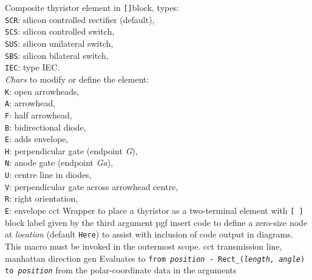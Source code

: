   {Composite thyristor element in {\tt []}block, types:\\
                     {\tt SCR}: silicon controlled rectifier (default),\\
                     {\tt SCS}: silicon controlled switch,\\
                     {\tt SUS}: silicon unilateral switch,\\
                     {\tt SBS}: silicon bilateral switch,\\
                     {\tt IEC}: type IEC.\\
   {\sl Chars} to modify or define the element:\\
                     {\tt K}: open arrowheads,\\
                     {\tt A}: arrowhead,\\
                     {\tt F}: half arrowhead,\\
                     {\tt B}: bidirectional diode,\\
                     {\tt E}: adds envelope,\\
                     {\tt H}: perpendicular gate (endpoint {\sl G}),\\
                     {\tt N}: anode gate (endpoint {\sl Ga}),\\
                     {\tt U}: centre line in diodes,\\
                     {\tt V}: perpendicular gate across arrowhead centre,\\
                     {\tt R}: right orientation,\\
                     {\tt E}: envelope
    }%
%
  {cct}%
  {Wrapper to place a thyristor as a two-terminal element with
   {\tt [ ]} block label given by the third argument
    }%
%
  {pgf}%
  {insert \Tikz code to define a zero-size \Tikz node at {\sl location}%
    (default {\tt Here}) to assist with inclusion of \pic code output
    in \Tikz diagrams.  This macro must be invoked in the outermost
    \pic scope.  }%
%
  {cct}%
  {transmission line, manhattan direction}%
%
  {gen}%
  {Evaluates to {\tt from {\sl position} - Rect\_({\sl length, angle}) to
   {\sl position}} from the polar-coordinate data in the arguments }%
